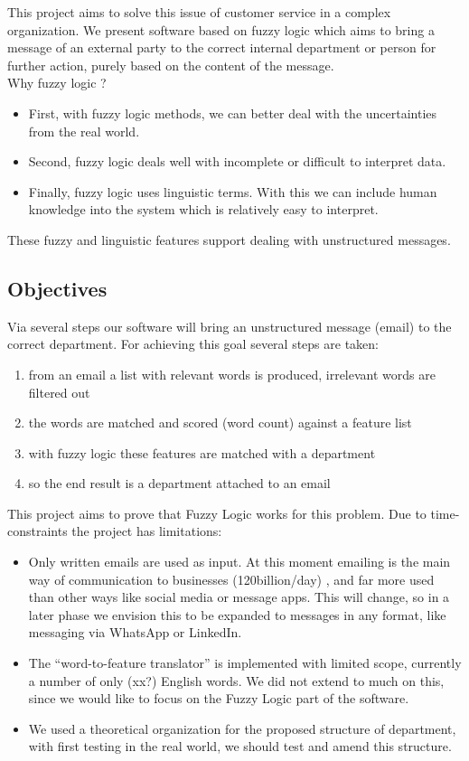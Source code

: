 \documentclass[journal]{IEEEtran}
\begin{document}
This project aims to solve this issue of customer service in a complex organization. We present software based on fuzzy logic which aims to bring a message of an external party to the correct internal department or person for further action, purely based on the content of the message. \\

Why fuzzy logic ?
\begin{itemize}
    \item First, with fuzzy logic methods, we can better deal with the uncertainties from the real world.
    \item Second, fuzzy logic deals well with incomplete or difficult to interpret data.
    \item Finally, fuzzy logic uses linguistic terms. With this we can include human knowledge into the system which is relatively easy to interpret.
\end{itemize}
These fuzzy and linguistic features support dealing with unstructured messages.

\subsection{Objectives}

Via several steps our software will bring an unstructured message (email) to the correct department. For achieving this goal several steps are taken:
\begin{enumerate}
    \item from an email a list with relevant words is produced, irrelevant words are filtered out
    \item the words are matched and scored (word count) against a feature list
    \item with fuzzy logic these features are matched with a department
    \item so the end result is a department attached to an email
\end{enumerate}

This project aims to prove that Fuzzy Logic works for this problem. Due to time-constraints the project has limitations:
\begin{itemize}
    \item Only written emails are used as input. At this moment emailing is the main way of communication to businesses (120billion/day) \cite{email_statistics}, and far more used than other ways like social media or message apps. This will change, so in a later phase we envision this to be expanded to messages in any format, like messaging via WhatsApp or LinkedIn.
    \item The ``word-to-feature translator'' is implemented with limited scope, currently a number of only (xx?) English words. We did not extend to much on this, since we would like to focus on the Fuzzy Logic part of the software.
    \item We used a theoretical organization for the proposed structure of department, with first testing in the real world, we should test and amend this structure. %
\end{itemize}
\end{document}
